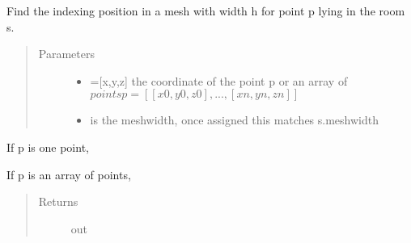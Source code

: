 \documentclass[letterpaper,10pt,english]{sphinxmanual}
\begin{document}
\begin{fulllineitems}
\begin{fulllineitems}
\end{fulllineitems}


\begin{fulllineitems}
\label{\detokenize{index:Room.room.position}}
Find the indexing position in a mesh with width h for point p     lying in the room s.
\begin{quote}\begin{description}
\item[{Parameters}] \leavevmode\begin{itemize}
\item {} 
 \textendash{} ={[}x,y,z{]} the co\sphinxhyphen{}ordinate of the point p or an array     of \(points p=[[x0,y0,z0],...,[xn,yn,zn]]\)

\item {} 
 \textendash{} is the meshwidth, once assigned this matches s.meshwidth

\end{itemize}

\end{description}\end{quote}

If p is one point,

\begin{sphinxVerbatim}[commandchars=\\\{\}]
\PYG{p}{[}\PYG{p}{]}
\end{sphinxVerbatim}

If p is an array of points,

\begin{sphinxVerbatim}[commandchars=\\\{\}]
\PYG{p}{[}\PYG{p}{[}\PYG{p}{]}\PYG{p}{[}\PYG{p}{]}\PYG{p}{]}
\end{sphinxVerbatim}
\begin{quote}\begin{description}
\item[{Returns}] \leavevmode
out


\end{description}
\end{quote}
\end{fulllineitems}
\end{fulllineitems}
\end{document}

